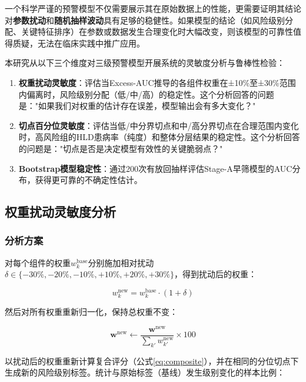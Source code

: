 \documentclass[12pt,a4paper]{ctexart}
\begin{document}
一个科学严谨的预警模型不仅需要展示其在原始数据上的性能，更需要证明其结论对\textbf{参数扰动}和\textbf{随机抽样波动}具有足够的稳健性。如果模型的结论（如风险级别分配、关键特征排序）在参数或数据发生合理变化时大幅改变，则该模型的可靠性值得质疑，无法在临床实践中推广应用。

本研究从以下三个维度对三级预警模型开展系统的灵敏度分析与鲁棒性检验：

\begin{enumerate}[label=(\arabic*)]
\item \textbf{权重扰动灵敏度}：评估当Excess-AUC推导的各组件权重在±10\%至±30\%范围内偏离时，风险级别分配（低/中/高）的稳定性。这个分析回答的问题是："如果我们对权重的估计存在误差，模型输出会有多大变化？"
\item \textbf{切点百分位灵敏度}：评估当低/中分界切点和中/高分界切点在合理范围内变化时，高风险组的HLD患病率（纯度）和整体分层结果的稳定性。这个分析回答的问题是："切点是否是决定模型有效性的关键脆弱点？"
\item \textbf{Bootstrap模型稳定性}：通过200次有放回抽样评估Stage-A早筛模型的AUC分布，获得更可靠的不确定性估计。
\end{enumerate}

\subsection{权重扰动灵敏度分析}

\subsubsection{分析方案}

对每个组件的权重$w_k^{\text{base}}$分别施加相对扰动$\delta \in \{-30\%, -20\%, -10\%, +10\%, +20\%, +30\%\}$，得到扰动后的权重：

\begin{equation}
w_k^{\text{new}} = w_k^{\text{base}} \cdot (1 + \delta)
\label{eq:weight_perturb}
\end{equation}

然后对所有权重重新归一化，保持总权重不变：

\begin{equation}
\mathbf{w}^{\text{new}} \leftarrow \frac{\mathbf{w}^{\text{new}}}{\displaystyle\sum_{k'} w_{k'}^{\text{new}}} \times 100
\label{eq:weight_renorm}
\end{equation}

以扰动后的权重重新计算复合评分（公式\ref{eq:composite}），并在相同的分位切点下生成新的风险级别标签。统计与原始标签（基线）发生级别变化的样本比例：
\end{document}
